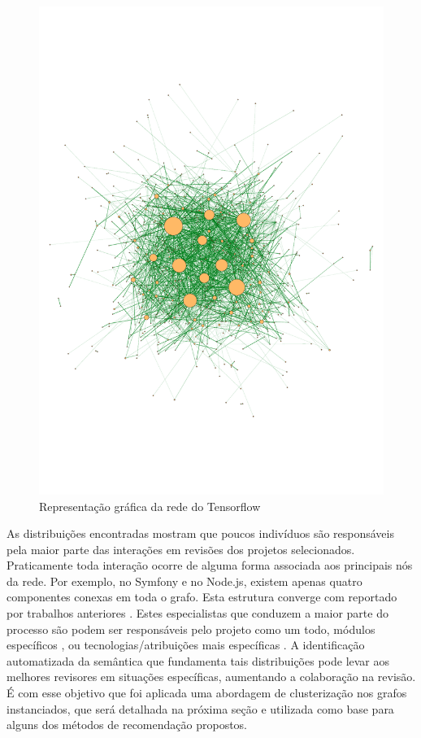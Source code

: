 \documentclass[12pt,openany,oneside,a4paper,english,brazil]{abntbibufjf}
\begin{document}
  \begin{figure}[tbp]
  \centerline{\includegraphics[width=.6\linewidth]{graph-tensorflow}}
  \caption{Representação gráfica da rede do Tensorflow}
  \label{fig:graph-tensorflow}
  \end{figure}


  As distribuições encontradas mostram que poucos indivíduos são responsáveis pela maior parte das interações em revisões dos projetos selecionados. Praticamente toda interação ocorre de alguma forma associada aos principais nós da rede. Por exemplo, no Symfony e no Node.js, existem apenas quatro componentes conexas em toda o grafo. Esta estrutura converge com reportado por trabalhos anteriores \cite{bergquist2001}. Estes especialistas que conduzem a maior parte do processo são podem ser responsáveis pelo projeto como um todo, módulos específicos \cite{firefox2018}, ou tecnologias/atribuições mais específicas \cite{debian2018}. A identificação automatizada da semântica que fundamenta tais distribuições pode levar aos melhores revisores em situações específicas, aumentando a colaboração na revisão. É com esse objetivo que foi aplicada uma abordagem de clusterização nos grafos instanciados, que será detalhada na próxima seção e utilizada como base para alguns dos métodos de recomendação propostos.
\end{document}
